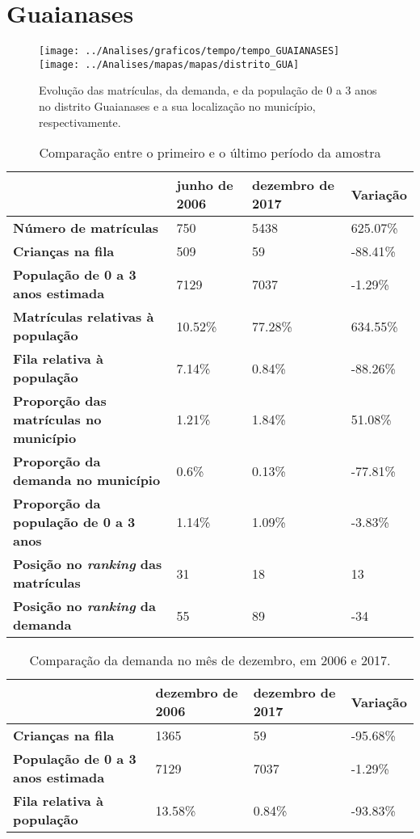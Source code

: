 \section{Guaianases}
\begin{figure}[H]
	\centering
	\texttt{[image: ../Analises/graficos/tempo/tempo\_GUAIANASES]}
	\texttt{[image: ../Analises/mapas/mapas/distrito\_GUA]}
	\caption{Evolução das matrículas, da demanda, e da população de 0 a 3 anos no distrito Guaianases e a sua localização no município, respectivamente.}
\end{figure}
\begin{table}[H]
	\begin{tabular}{|l|l|l|l|}
		\hline
		\textbf{}                                      & \textbf{junho de 2006}       & \textbf{dezembro de 2017}    & \textbf{Variação} \\ \hline
		\textbf{Número de matrículas}                  & 750 & 5438 & 625.07\% \\ \hline
		\textbf{Crianças na fila}                      & 509 & 59 & -88.41\% \\ \hline
		\textbf{População de 0 a 3 anos estimada}      & 7129 & 7037 & -1.29\% \\ \hline
		\textbf{Matrículas relativas à população}      & 10.52\% & 77.28\% & 634.55\% \\ \hline
		\textbf{Fila relativa à população}             & 7.14\% & 0.84\% & -88.26\% \\ \hline
		\textbf{Proporção das matrículas no município} & 1.21\% & 1.84\% & 51.08\% \\ \hline
		\textbf{Proporção da demanda no município}     & 0.6\% & 0.13\% & -77.81\% \\ \hline
		\textbf{Proporção da população de 0 a 3 anos}  & 1.14\% & 1.09\% & -3.83\% \\ \hline
		\textbf{Posição no \textit{ranking} das matrículas}     & 31 & 18 & 13 \\ \hline
		\textbf{Posição no \textit{ranking} da demanda}         & 55 & 89 & -34 \\ \hline
	\end{tabular}
	\caption{Comparação entre o primeiro e o último período da amostra}
\end{table}
\begin{table}[H]
	\begin{tabular}{|l|l|l|l|}
		\hline
		\textbf{}                                 & \textbf{dezembro de 2006} & \textbf{dezembro de 2017} & \textbf{Variação} \\ \hline
		\textbf{Crianças na fila}                      & 1365 & 59 & -95.68\% \\ \hline
		\textbf{População de 0 a 3 anos estimada}      & 7129 & 7037 & -1.29\% \\ \hline
		\textbf{Fila relativa à população}             & 13.58\% & 0.84\% & -93.83\% \\ \hline
	\end{tabular}
	\caption{Comparação da demanda no mês de dezembro, em 2006 e 2017.}
\end{table}
